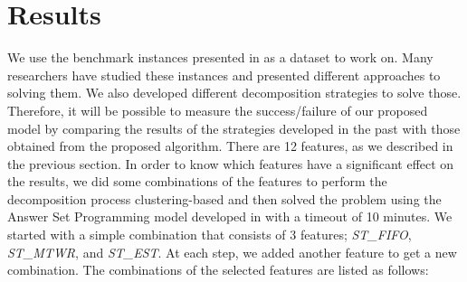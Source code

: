 \documentclass[runningheads]{llncs}
\newcommand{\stest}{\textit{ST\_EST}\xspace}
\newcommand{\stmtwr}{\textit{ST\_MTWR}\xspace}
\newcommand{\stfifo}{\textit{ST\_FIFO}\xspace}
\begin{document}
\section{Results}
\label{sec:eval}
We use the benchmark instances presented in \cite{taillard1993benchmarks} as a dataset to work on. Many researchers have studied these instances and presented different approaches to solving them. We also developed different decomposition strategies to solve those. Therefore, it will be possible to measure the success/failure of our proposed model by comparing the results of the strategies developed in the past with those obtained from the proposed algorithm. There are 12 features, as we described in the previous section. In order to know which features have a significant effect on the results, we did some combinations of the features to perform the decomposition process clustering-based and then solved the problem using the Answer Set Programming model developed in \cite{el2020job} with a timeout of 10 minutes. We started with a simple combination that consists of $3$ features; \stfifo, \stmtwr, and \stest. At each step, we added another feature to get a new combination. The combinations of the selected features are listed as follows:
\end{document}
